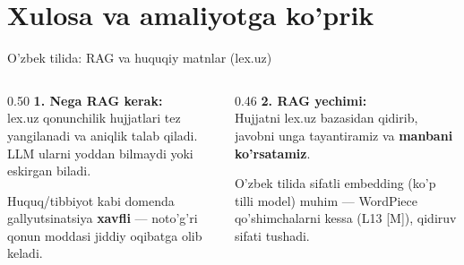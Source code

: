 \documentclass[aspectratio=169,11pt]{beamer}
\begin{document}
\section[Xulosa]{Xulosa va amaliyotga ko'prik}

\begin{frame}{O'zbek tilida: RAG va huquqiy matnlar (lex.uz)}
  \begin{columns}[T]
    \begin{column}{0.50\textwidth}
      \textbf{1. Nega RAG kerak:}\\[3pt]
      \small
      lex.uz qonunchilik hujjatlari tez yangilanadi va aniqlik talab qiladi.
      LLM ularni yoddan bilmaydi yoki eskirgan biladi.
      \begin{tcolorbox}[warnbox,title=Xavf,top=2pt,bottom=2pt]
        \footnotesize
        Huquq/tibbiyot kabi domenda gallyutsinatsiya \textbf{xavfli} --- noto'g'ri
        qonun moddasi jiddiy oqibatga olib keladi.
      \end{tcolorbox}
    \end{column}
    \begin{column}{0.46\textwidth}
      \textbf{2. RAG yechimi:}\\[3pt]
      \small
      Hujjatni lex.uz bazasidan qidirib, javobni unga tayantiramiz va
      \textbf{manbani ko'rsatamiz}.
      \begin{tcolorbox}[okbox,top=2pt,bottom=2pt]
        \footnotesize
        O'zbek tilida sifatli embedding (ko'p tilli model) muhim --- WordPiece
        qo'shimchalarni kessa (L13 [M]), qidiruv sifati tushadi.
      \end{tcolorbox}
    \end{column}
  \end{columns}
\end{frame}
\end{document}
